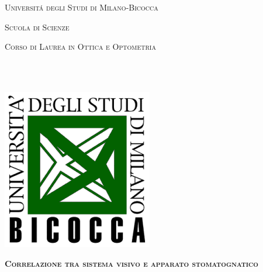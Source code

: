 \documentclass [a4paper,11pt]{book}
\begin{document}
\frontmatter

\newpage
\thispagestyle{empty}
\noindent
\hspace*{-1mm}

\begin{center}
{\LARGE\textsc{Universit\'a degli Studi di Milano-Bicocca}\par}
{\Large\textsc{Scuola di Scienze}\par}
{\Large\textsc{Corso di Laurea in Ottica e Optometria}\par}
\end{center}

\\\
\begin{center}
\includegraphics[scale=1]{source/immagini/logo_bicocca_colorato.png}
\end{center}
\vfill

\begin{center}
{\Huge\textsc{\textbf{Correlazione tra sistema visivo e apparato stomatognatico }}\par}
\end{center}
\vfill
\large
\vskip 1cm
\end{document}
